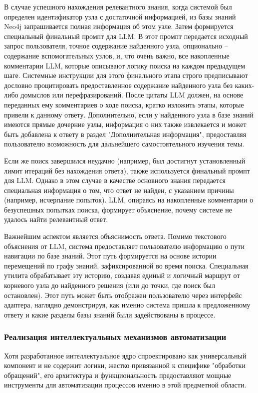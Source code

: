 В случае успешного нахождения релевантного знания, когда системой был определен идентификатор узла с достаточной информацией, из базы знаний Neo4j запрашивается полная информация об этом узле. Затем формируется специальный финальный промпт для LLM. В этот промпт передается исходный запрос пользователя, точное содержание найденного узла, опционально – содержание вспомогательных узлов, и, что очень важно, все накопленные комментарии LLM, которые описывают логику поиска на каждом предыдущем шаге. Системные инструкции для этого финального этапа строго предписывают дословно процитировать предоставленное содержание найденного узла без каких-либо домыслов или перефразирований. После цитаты LLM должен, на основе переданных ему комментариев о ходе поиска, кратко изложить этапы, которые привели к данному ответу. Дополнительно, если у найденного узла в базе знаний имеются прямые дочерние узлы, информация о них также извлекается и может быть добавлена к ответу в раздел "Дополнительная информация", предоставляя пользователю возможность для дальнейшего самостоятельного изучения темы.

Если же поиск завершился неудачно (например, был достигнут установленный лимит итераций без нахождения ответа), также используется финальный промпт для LLM. Однако в этом случае в качестве основного знания передается специальная информация о том, что ответ не найден, с указанием причины (например, исчерпание попыток). LLM, опираясь на накопленные комментарии о безуспешных попытках поиска, формирует объяснение, почему системе не удалось найти релевантный ответ.

Важнейшим аспектом является объяснимость ответа. Помимо текстового объяснения от LLM, система предоставляет пользователю информацию о пути навигации по базе знаний. Этот путь формируется на основе истории перемещений по графу знаний, зафиксированной во время поиска. Специальная утилита обрабатывает эту историю, создавая единый и логичный маршрут от корневого узла до найденного решения (или до точки, где поиск был остановлен). Этот путь может быть отображен пользователю через интерфейс адаптера, наглядно демонстрируя, как именно система пришла к предложенному ответу и какие разделы базы знаний были задействованы в процессе.

\subsubsection{Реализация интеллектуальных механизмов автоматизации}

Хотя разработанное интеллектуальное ядро спроектировано как универсальный компонент и не содержит логики, жестко привязанной к специфике "обработки обращений", его архитектура и функциональность предоставляют мощные инструменты для автоматизации процессов именно в этой предметной области.

